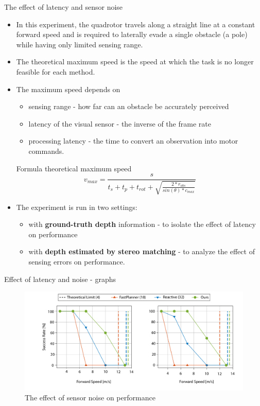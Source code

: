 \documentclass{beamer}
\begin{document}
\begin{frame}[allowframebreaks]{The effect of latency and sensor noise}
	\begin{itemize}
		\item In this experiment, the quadrotor travels along a straight line at a constant forward speed and is required to laterally evade a single obstacle (a pole) while having only limited sensing range.
		\item The theoretical maximum speed is the speed at which the task is no longer feasible for each method. 
		\item The maximum speed depends on 
		\begin{itemize}
			\item sensing range - how far can an obstacle be accurately perceived
			\item latency of the visual sensor - the inverse of the frame rate
			\item processing latency - the time to convert an observation into motor commands.
		\end{itemize} 
	
		\pagebreak
		
		\begin{block}{Formula}
			theoretical maximum speed
			\begin{equation}
				v_{max} = \frac{s}{t_s + t_p + t_{rot} + \sqrt{\frac{2*r_{obs}}{sin(\theta)*c_{max}}}}
			\end{equation}
		\end{block}
		\item The experiment is run in two settings:
		\begin{itemize}
			\item with \textbf{ground-truth depth} information - to isolate the effect of latency on performance
			\item with \textbf{depth estimated by stereo matching}\autocite{stereoMatching} - to analyze the effect of sensing errors on performance.
		\end{itemize}
	\end{itemize}
\end{frame}

\begin{frame}{Effect of latency and noise - graphs}
	\begin{figure}
		\includegraphics{images/noise-graph.png}
		\caption{The effect of sensor noise on performance}
	\end{figure}
\end{frame}
\end{document}
